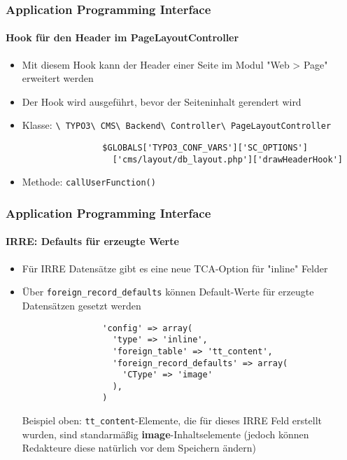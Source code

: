\begin{frame}[fragile]
	\frametitle{Application Programming Interface}
	\framesubtitle{Hook für den Header im PageLayoutController}

	\begin{itemize}
		\item Mit diesem Hook kann der Header einer Seite im Modul "Web > Page" erweitert werden
		\item Der Hook wird ausgeführt, bevor der Seiteninhalt gerendert wird
		\item Klasse:\newline
			\smaller
				\texttt{\textbackslash
					TYPO3\textbackslash
					CMS\textbackslash
					Backend\textbackslash
					Controller\textbackslash
					PageLayoutController}\normalsize

			\lstset{
				basicstyle=\smaller\ttfamily
			}

			\begin{lstlisting}
				$GLOBALS['TYPO3_CONF_VARS']['SC_OPTIONS']
				  ['cms/layout/db_layout.php']['drawHeaderHook']
			\end{lstlisting}

		\item Methode:\newline
			\smaller
				\texttt{callUserFunction()}

	\end{itemize}

\end{frame}


\begin{frame}[fragile]
	\frametitle{Application Programming Interface}
	\framesubtitle{IRRE: Defaults für erzeugte Werte}

	\begin{itemize}
		\item Für IRRE Datensätze gibt es eine neue TCA-Option für "inline" Felder
		\item Über \texttt{foreign\_record\_defaults} können Default-Werte für erzeugte Datensätzen gesetzt werden

			\begin{lstlisting}
				'config' => array(
				  'type' => 'inline',
				  'foreign_table' => 'tt_content',
				  'foreign_record_defaults' => array(
				    'CType' => 'image'
				  ),
				)
			\end{lstlisting}

			\small
				Beispiel oben: \texttt{tt\_content}-Elemente, die für dieses IRRE Feld erstellt wurden, sind standarmäßig \textbf{image}-Inhaltselemente (jedoch können Redakteure diese natürlich vor dem Speichern ändern)
			\normalsize

	\end{itemize}

\end{frame}

